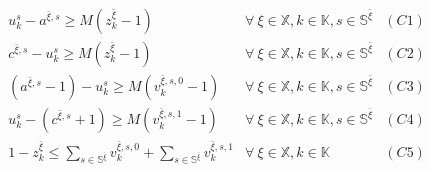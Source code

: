 \documentclass[]{interact}
\theoremstyle{plain}%
\theoremstyle{definition}
\theoremstyle{remark}
\begin{document}
\begin{eqnarray}
u^s_k - a^{\bar{\xi},s} \ge M(z^{\bar{\xi}}_{k}-1)&\forall\ \xi\in \mathbb{X},k\in \mathbb{K},s\in \mathbb{S}^{\bar{\xi}}&(C1)\nonumber\\
c^{\bar{\xi},s} - u^s_k \ge M(z^{\bar{\xi}}_{k}-1)&\forall\ \xi\in \mathbb{X},k\in \mathbb{K},s\in \mathbb{S}^{\bar{\xi}}&(C2)\nonumber\\
( a^{\bar{\xi},s}-1) - u^s_k \ge M(v^{\bar{\xi},s,0}_k-1) & \forall\ \xi\in \mathbb{X},k\in \mathbb{K},s\in \mathbb{S}^{\bar{\xi}} &(C3)\nonumber\\
u^s_k -  (c^{\bar{\xi},s}+1) \ge M(v^{\bar{\xi},s,1}_k-1) & \forall\ \xi\in \mathbb{X},k\in \mathbb{K},s\in \mathbb{S}^{\bar{\xi}} &(C4)\nonumber\\
1 - z^{\bar{\xi}}_{k} \le \sum_{s\in \mathbb{S}^{\bar{\xi}}} v^{\bar{\xi},s,0}_k + \sum_{s\in \mathbb{S}^{\bar{\xi}}} v^{\bar{\xi},s,1}_k&\forall\ \xi\in \mathbb{X},k\in \mathbb{K}&(C5)\nonumber
\end{eqnarray}
\end{document}
